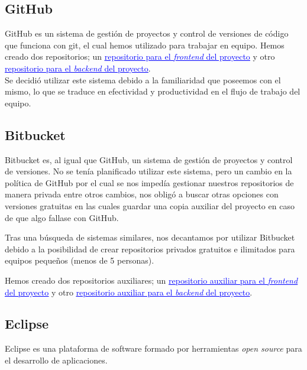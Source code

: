      \subsection{GitHub}
     GitHub\cite{github} es un sistema de gestión de proyectos y control de versiones de código que funciona con git, el cual hemos utilizado para trabajar en equipo. Hemos creado dos repositorios; un  \href{https://github.com/myscel/tfg-estudio-medico-front}{\textcolor{blue}{\underline{repositorio para el \textit{frontend} del proyecto}}} y otro  \href{https://github.com/myscel/tfg-estudio-medico-back}{\textcolor{blue}{\underline{repositorio para el \textit{backend} del proyecto}}}. \\
     \newline
     Se decidió utilizar este sistema debido a la familiaridad que poseemos con el mismo, lo que se traduce en efectividad y productividad en el flujo de trabajo del equipo.
     
 

     \subsection{Bitbucket}
     Bitbucket\cite{bitbucket} es, al igual que GitHub, un sistema de gestión de proyectos y control de versiones. No se tenía planificado utilizar este sistema, pero un cambio en la política de GitHub por el cual se nos impedía gestionar nuestros repositorios de manera privada entre otros cambios, nos obligó a buscar otras opciones con versiones gratuitas en las cuales guardar una copia auxiliar del proyecto en caso de que algo fallase con GitHub.
     \newline
     
     Tras una búsqueda de sistemas similares, nos decantamos por utilizar Bitbucket debido a la posibilidad de crear repositorios privados gratuitos e ilimitados para equipos pequeños (menos de 5 personas). \newline
     
     Hemos creado dos repositorios auxiliares; un  \href{https://bitbucket.org/myscel/tfg-estudio-medico-front/src/master/}{\textcolor{blue}{\underline{repositorio auxiliar para el \textit{frontend} del proyecto}}} y otro  \href{https://bitbucket.org/myscel/tfg-estudio-medico-back/src/master/}{\textcolor{blue}{\underline{repositorio auxiliar para el \textit{backend} del proyecto}}}.
     
     \subsection{Eclipse}
     Eclipse\cite{eclipse} es una plataforma de software formado por herramientas \textit{open source} para el desarrollo de aplicaciones.
     \newline
     
